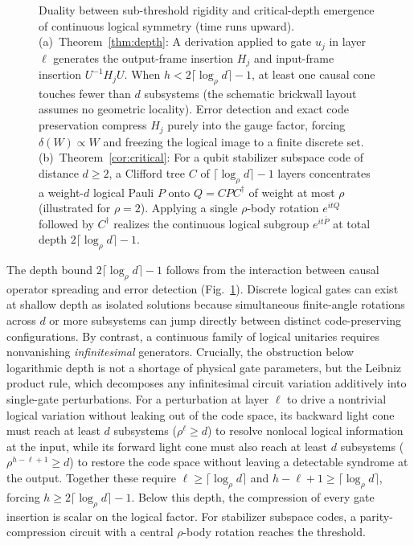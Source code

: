 \documentclass[aps,prl,reprint,notitlepage,nofootinbib,nobibnotes]{revtex4-2}
\begin{document}
\begin{figure}[t]
{%
}
\caption{Duality between sub-threshold rigidity and critical-depth emergence of continuous logical symmetry (time runs upward).
(a)~Theorem~\ref{thm:depth}: A derivation applied to gate \(u_j\) in layer \(\ell\) generates the output-frame insertion \(H_j\) and input-frame insertion \(U^{-1}H_jU\). When \(h<2\lceil\log_\rho d\rceil-1\), at least one causal cone touches fewer than \(d\) subsystems (the schematic brickwall layout assumes no geometric locality). Error detection and exact code preservation compress \(H_j\) purely into the gauge factor, forcing \(\delta(W)\propto W\) and freezing the logical image to a finite discrete set.
(b)~Theorem~\ref{cor:critical}: For a qubit stabilizer subspace code of distance \(d\ge2\), a Clifford tree \(C\) of \(\lceil\log_\rho d\rceil-1\) layers concentrates a weight-\(d\) logical Pauli \(P\) onto \(Q=CPC^\dagger\) of weight at most \(\rho\) (illustrated for \(\rho=2\)). Applying a single \(\rho\)-body rotation \(e^{itQ}\) followed by \(C^\dagger\) realizes the continuous logical subgroup \(e^{it\overline P}\) at total depth \(2\lceil\log_\rho d\rceil-1\).}
\label{fig:mechanisms}
\end{figure}

The depth bound \(2\lceil\log_{\rho} d\rceil-1\) follows from the interaction between causal operator spreading and error detection (Fig.~\ref{fig:mechanisms}). Discrete logical gates can exist at shallow depth as isolated solutions because simultaneous finite-angle rotations across \(d\) or more subsystems can jump directly between distinct code-preserving configurations. By contrast, a continuous family of logical unitaries requires nonvanishing \emph{infinitesimal} generators. Crucially, the obstruction below logarithmic depth is not a shortage of physical gate parameters, but the Leibniz product rule, which decomposes any infinitesimal circuit variation additively into single-gate perturbations. For a perturbation at layer \(\ell\) to drive a nontrivial logical variation without leaking out of the code space, its backward light cone must reach at least \(d\) subsystems (\(\rho^{\ell}\ge d\)) to resolve nonlocal logical information at the input, while its forward light cone must also reach at least \(d\) subsystems (\(\rho^{h-\ell+1}\ge d\)) to restore the code space without leaving a detectable syndrome at the output. Together these require \(\ell\ge\lceil\log_\rho d\rceil\) and \(h-\ell+1\ge\lceil\log_\rho d\rceil\), forcing \(h\ge 2\lceil\log_\rho d\rceil-1\). Below this depth, the compression of every gate insertion is scalar on the logical factor. For stabilizer subspace codes, a parity-compression circuit with a central \(\rho\)-body rotation reaches the threshold.
\end{document}
